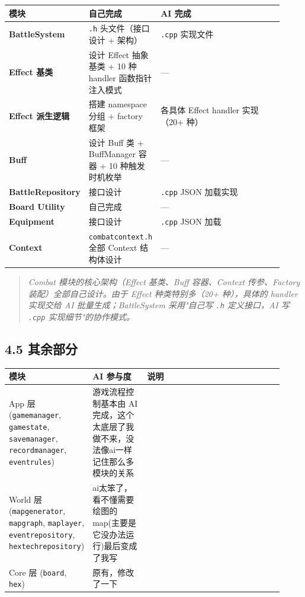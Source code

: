 \documentclass[UTF8,10pt]{ctexart}
\begin{document}
{\small
\begin{longtable}{p{0.22\linewidth}p{0.20\linewidth}p{0.50\linewidth}}
\toprule
\textbf{模块} & \textbf{自己完成} & \textbf{AI 完成} \\
\midrule
\textbf{BattleSystem} & \texttt{.\allowbreak{}h} 头文件（接口设计 + 架构） & \texttt{.\allowbreak{}cpp} 实现文件 \\
\textbf{Effect 基类} & 设计 Effect 抽象基类 + 10 种 handler 函数指针注入模式 & — \\
\textbf{Effect 派生逻辑} & 搭建 namespace 分组 + factory 框架 & 各具体 Effect handler 实现（20+ 种） \\
\textbf{Buff} & 设计 Buff 类 + BuffManager 容器 + 10 种触发时机枚举 & — \\
\textbf{BattleRepository} & 接口设计 & \texttt{.\allowbreak{}cpp} JSON 加载实现 \\
\textbf{Board Utility} & 自己完成 & — \\
\textbf{Equipment} & 接口设计 & \texttt{.\allowbreak{}cpp} JSON 加载 \\
\textbf{Context} & \texttt{combatcontext.\allowbreak{}h} 全部 Context 结构体设计 & — \\
\bottomrule
\end{longtable}
}

\begin{quote}\itshape Combat 模块的核心架构（Effect 基类、Buff 容器、Context 传参、Factory 装配）全部自己设计。由于 Effect 种类特别多（20+ 种），具体的 handler 实现交给 AI 批量生成；BattleSystem 采用"自己写 \texttt{.\allowbreak{}h} 定义接口，AI 写 \texttt{.\allowbreak{}cpp} 实现细节"的协作模式。\end{quote}

\subsection*{4.5 其余部分}

{\small
\begin{longtable}{p{0.22\linewidth}p{0.20\linewidth}p{0.50\linewidth}}
\toprule
\textbf{模块} & \textbf{AI 参与度} & \textbf{说明} \\
\midrule
App 层 (\texttt{gamemanager}, \texttt{gamestate}, \texttt{savemanager}, \texttt{recordmanager}, \texttt{eventrules}) & 游戏流程控制基本由 AI 完成，这个太底层了我做不来，没法像ai一样记住那么多模块的关系 &  \\
World 层 (\texttt{mapgenerator}, \texttt{mapgraph}, \texttt{maplayer}, \texttt{eventrepository}, \texttt{hextechrepository}) & ai太笨了，看不懂需要绘图的map(主要是它没办法运行)最后变成了我写 &  \\
Core 层 (\texttt{board}, \texttt{hex}) & 原有，修改了一下 &  \\
\bottomrule
\end{longtable}
}
\end{document}
